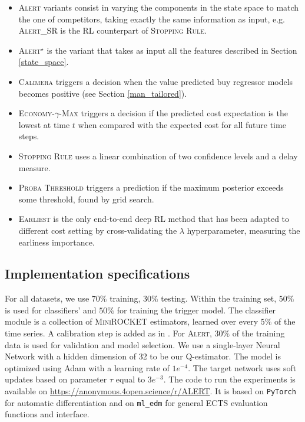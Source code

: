 \documentclass[sigconf, nonacm, table]{acmart}
\begin{document}
\begin{itemize}
    \item \textsc{Alert} variants %
    consist in varying the components in the state space to match the one of competitors, 
    taking exactly the same information as input, e.g. \textsc{Alert\_SR} is the RL counterpart of \textsc{Stopping Rule}. 
    
    \item \textsc{Alert}$^\star$ is the variant that takes as input all the features described in Section \ref{state_space}.
    
    \item \textsc{Calimera} \cite{bilski2023calimera} triggers a decision when the value predicted buy regressor models becomes positive (see Section \ref{man_tailored}). 
    
    \item \textsc{Economy-$\gamma$-Max} \cite{achenchabe2021early} triggers a decision if the predicted cost expectation is the lowest at time $t$ when compared with the expected cost for all future time steps. %
    
    \item \textsc{Stopping Rule} \cite{mori2017early} uses a linear combination of two confidence levels and a delay measure.
    
    \item \textsc{Proba Threshold} triggers a prediction if the maximum posterior exceeds some threshold, found by grid search.
    
    \item \textsc{Earliest} \cite{hartvigsen2019adaptive} is the only end-to-end deep RL method that has been adapted to different cost setting by cross-validating the $\lambda$ hyperparameter, measuring the earliness importance. 
\end{itemize}



\subsection{Implementation specifications}
For all datasets, we use $70\%$ training, $30\%$ testing. Within the training set, $50\%$ is used for classifiers' and $50\%$ for training the trigger model. The classifier module is a collection of \textsc{MiniROCKET} \cite{dempster2021minirocket} estimators, learned over every $5\%$ of the time series. A calibration step is added as in \cite{bilski2023calimera, renault2024early}. For \textsc{Alert}, $30\%$ of the training data is used for validation and model selection. We use a single-layer Neural Network with a hidden dimension of 32 to be our Q-estimator. The model is optimized using Adam \cite{kingma2015adam} with a learning rate of $1e^{-4}$. The target network uses soft updates based on parameter $\tau$ \cite{lillicrap2015continuous} equal to $3e^{-3}$. The code to run the experiments is available on \url{https://anonymous.4open.science/r/ALERT}. It is based on \texttt{PyTorch} \cite{paszke2019pytorch} for automatic differentiation and on \texttt{ml\_edm} \cite{renault2024ml_edm} for general ECTS evaluation functions and interface.
\end{document}
